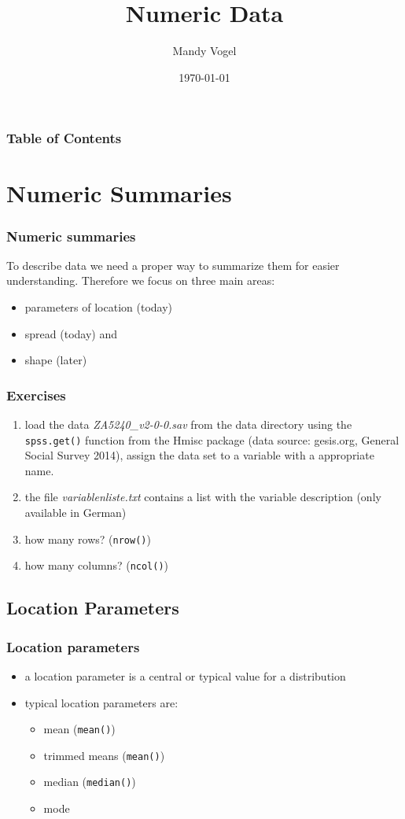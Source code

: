 \documentclass[xcolor={table}]{beamer}
\begin{document}
\title{Numeric Data}   
\author{Mandy Vogel} 
\date{\today}

\begin{frame}
\titlepage
\end{frame}

\begin{frame}
\frametitle{Table of Contents}\tableofcontents
\end{frame}


\section{Numeric Summaries}
\begin{frame}\frametitle{Numeric summaries}
  To describe data we need a proper way to summarize them for easier understanding. Therefore we focus on three main areas:
  \begin{itemize}
  \item parameters of location (today)
  \item spread (today) and
  \item shape (later)
  \end{itemize}
\end{frame}


\begin{frame}\frametitle{Exercises} 
  \begin{enumerate}
  \item load the data \textit{ZA5240\_v2-0-0.sav} from the data directory using the \texttt{spss.get()} function from the Hmisc package (data source: gesis.org, General Social Survey 2014), assign the data set to a variable with a appropriate name.
  \item the file \textit{variablenliste.txt} contains a list with the variable description (only available in German)
  \item how many rows? (\texttt{nrow()})
  \item how many columns? (\texttt{ncol()})
  \end{enumerate}
\end{frame}


\subsection{Location Parameters}
\begin{frame}\frametitle{Location parameters}
  \begin{itemize}
  \item a location parameter is a central or typical value for a distribution
  \item typical location parameters are:
    \begin{itemize}
    \item mean (\texttt{mean()})
    \item trimmed means (\texttt{mean()})
    \item median (\texttt{median()})
    \item mode 
    \end{itemize}
  \end{itemize}  
\end{frame}
\end{document}

